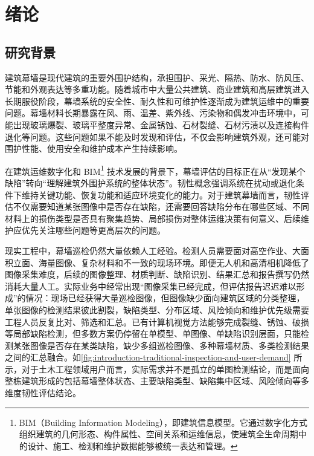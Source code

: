 \chapter{绪论}
\label{chap:introduction}

\section{研究背景}
\label{sec:introduction-research-background}

建筑幕墙是现代建筑的重要外围护结构，承担围护、采光、隔热、防水、防风压、节能和外观表达等多重功能。随着城市中大量公共建筑、商业建筑和高层建筑进入长期服役阶段，幕墙系统的安全性、耐久性和可维护性逐渐成为建筑运维中的重要问题。幕墙材料长期暴露在风、雨、温差、紫外线、污染物和偶发冲击环境中，可能出现玻璃爆裂、玻璃平整度异常、金属锈蚀、石材裂缝、石材污渍以及连接构件退化等问题。这些问题如果不能及时发现和评估，不仅会影响建筑外观，还可能对围护性能、使用安全和维护成本产生持续影响。

在建筑运维数字化和 BIM\footnote{BIM（Building Information Modeling），即建筑信息模型。它通过数字化方式组织建筑的几何形态、构件属性、空间关系和运维信息，使建筑全生命周期中的设计、施工、检测和维护数据能够被统一表达和管理\cite{gbt51212-2016}。} 技术发展的背景下，幕墙评估的目标正在从“发现某个缺陷”转向“理解建筑外围护系统的整体状态”。韧性概念强调系统在扰动或退化条件下维持关键功能、恢复功能和适应环境变化的能力\cite{shi2023resilientcity}。对于建筑幕墙而言，韧性评估不仅需要知道某张图像中是否存在缺陷，还需要回答缺陷分布在哪些区域、不同材料上的损伤类型是否具有聚集趋势、局部损伤对整体运维决策有何意义、后续维护应优先关注哪些问题等更高层次的问题。

现实工程中，幕墙巡检仍然大量依赖人工经验。检测人员需要面对高空作业、大面积立面、海量图像、复杂材料和不一致的现场环境。即便无人机和高清相机降低了图像采集难度，后续的图像整理、材质判断、缺陷识别、结果汇总和报告撰写仍然消耗大量人工。实际业务中经常出现“图像采集已经完成，但评估报告迟迟难以形成”的情况：现场已经获得大量巡检图像，但图像缺少面向建筑区域的分类整理，单张图像的检测结果彼此割裂，缺陷类型、分布区域、风险倾向和维护优先级需要工程人员反复比对、筛选和汇总。已有计算机视觉方法能够完成裂缝、锈蚀、破损等局部缺陷检测，但多数方案仍停留在单模型、单图像、单缺陷识别层面，只能检测某张图像是否存在某类缺陷，缺少多组巡检图像、多种幕墙材质、多类检测结果之间的汇总融合。如\cref{fig:introduction-traditional-inspection-and-user-demand} 所示，对于土木工程领域用户而言，实际需求并不是孤立的单图检测结论，而是面向整栋建筑形成的包括幕墙整体状态、主要缺陷类型、缺陷集中区域、风险倾向等多维度韧性评估结论。


